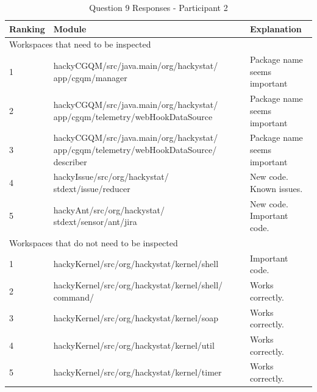 \begin{table}[!h]
  \begin{center}
    \caption{Question 9 Responses - Participant 2}
    \label{tab:pre-selection-questionnaire-results-9-p2}
    \begin{tabular}{|p{2.0cm}|p{7.0cm}|p{4.0cm}|} \hline
{\bf Ranking} & {\bf Module} & {\bf Explanation} \\ \hline
\multicolumn{3}{|p{13.0cm}|}{Workspaces that need to be inspected} \\ \hline
1 & hackyCGQM/src/java.main/org/hackystat/ app/cgqm/manager & Package name
seems important \\ \hline
2 &
hackyCGQM/src/java.main/org/hackystat/ app/cgqm/telemetry/webHookDataSource
& Package name seems important \\ \hline 
3 &
hackyCGQM/src/java.main/org/hackystat/
app/cgqm/telemetry/webHookDataSource/ describer & Package name seems
important \\ \hline  
4 & hackyIssue/src/org/hackystat/ stdext/issue/reducer & New code. Known
issues. \\ \hline
5 & hackyAnt/src/org/hackystat/ stdext/sensor/ant/jira & New code. Important 
code. \\ \hline
\multicolumn{3}{|p{13.0cm}|}{Workspaces that do not need to be inspected} \\ \hline
1 & hackyKernel/src/org/hackystat/kernel/shell & Important code. \\ \hline
2 & hackyKernel/src/org/hackystat/kernel/shell/ command/ & Works correctly.
\\ \hline
3 & hackyKernel/src/org/hackystat/kernel/soap & Works correctly.  \\ \hline
4 & hackyKernel/src/org/hackystat/kernel/util & Works correctly.  \\ \hline
5 & hackyKernel/src/org/hackystat/kernel/timer & Works correctly.  \\ \hline
    \end{tabular}
  \end{center}
\end{table}


